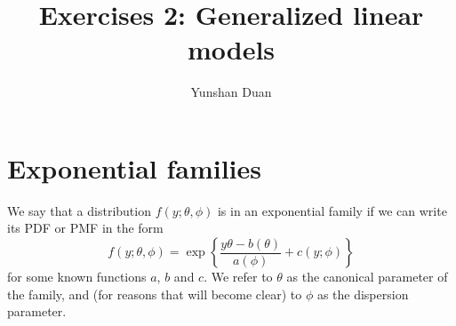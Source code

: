 \documentclass[11pt]{article}
\title{Exercises 2: Generalized linear models}
\author{Yunshan Duan }
\date{}  %
\begin{document}
\maketitle%

\section{Exponential families}

We say that a distribution $f(y; \theta, \phi)$ is in an exponential family if we can write its PDF or PMF in the form
$$
f(y; \theta, \phi) = \exp \left\{ \frac{y \theta - b(\theta)}{a(\phi)} + c(y; \phi)   \right \}
$$
for some known functions $a$, $b$ and $c$.  We refer to $\theta$ as the canonical parameter of the family, and  (for reasons that will become clear) to $\phi$ as the dispersion parameter.  
\end{document}
